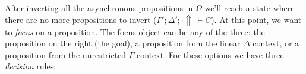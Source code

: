 \documentclass{llncs}
\begin{document}
After inverting all the asynchronous propositions in $\Omega$ we'll reach a state
where there are no more propositions to invert ($\Gamma'; \Delta'; \cdot
\Uparrow\ \vdash C$). At this point, we want to \emph{focus} on a proposition.
The focus object can be any of the three: the proposition on the right (the
goal), a proposition from the linear $\Delta$ context, or a proposition from the
unrestricted $\Gamma$ context. For these options we have three \emph{decision}
rules:
\end{document}
